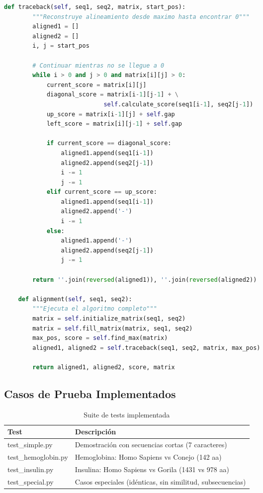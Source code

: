 \documentclass[12pt,a4paper]{article}
\begin{document}
\begin{lstlisting}[language=Python, caption=Clase SmithWaterman en Python]
    def traceback(self, seq1, seq2, matrix, start_pos):
        """Reconstruye alineamiento desde maximo hasta encontrar 0"""
        aligned1 = []
        aligned2 = []
        i, j = start_pos
        
        # Continuar mientras no se llegue a 0
        while i > 0 and j > 0 and matrix[i][j] > 0:
            current_score = matrix[i][j]
            diagonal_score = matrix[i-1][j-1] + \
                            self.calculate_score(seq1[i-1], seq2[j-1])
            up_score = matrix[i-1][j] + self.gap
            left_score = matrix[i][j-1] + self.gap
            
            if current_score == diagonal_score:
                aligned1.append(seq1[i-1])
                aligned2.append(seq2[j-1])
                i -= 1
                j -= 1
            elif current_score == up_score:
                aligned1.append(seq1[i-1])
                aligned2.append('-')
                i -= 1
            else:
                aligned1.append('-')
                aligned2.append(seq2[j-1])
                j -= 1
        
        return ''.join(reversed(aligned1)), ''.join(reversed(aligned2))
    
    def alignment(self, seq1, seq2):
        """Ejecuta el algoritmo completo"""
        matrix = self.initialize_matrix(seq1, seq2)
        matrix = self.fill_matrix(matrix, seq1, seq2)
        max_pos, score = self.find_max(matrix)
        aligned1, aligned2 = self.traceback(seq1, seq2, matrix, max_pos)
        
        return aligned1, aligned2, score, matrix
\end{lstlisting}

\subsection{Casos de Prueba Implementados}

\begin{table}[H]
\centering
\caption{Suite de tests implementada}
\begin{tabular}{@{}lp{8cm}@{}}
\toprule
\textbf{Test} & \textbf{Descripción} \\ \midrule
test\_simple.py & Demostración con secuencias cortas (7 caracteres) \\
test\_hemoglobin.py & Hemoglobina: Homo Sapiens vs Conejo (142 aa) \\
test\_insulin.py & Insulina: Homo Sapiens vs Gorila (1431 vs 978 aa) \\
test\_special.py & Casos especiales (idénticas, sin similitud, subsecuencias) \\ \bottomrule
\end{tabular}
\label{tab:tests}
\end{table}
\end{document}
